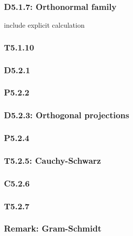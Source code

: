 \documentclass{article}
\begin{document}
\begin{multicols*}{3}
\subsubsection*{D5.1.7: Orthonormal family}
include explicit calculation

\subsubsection*{T5.1.10}

\subsubsection*{D5.2.1}

\subsubsection*{P5.2.2}

\subsubsection*{D5.2.3: Orthogonal projections}

\subsubsection*{P5.2.4}

\subsubsection*{T5.2.5: Cauchy-Schwarz}

\subsubsection*{C5.2.6}

\subsubsection*{T5.2.7}

\subsubsection*{Remark: Gram-Schmidt}

\end{multicols*}
\end{document}
